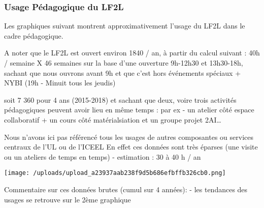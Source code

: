 \hypertarget{usage-puxe9dagogique-du-lf2l}{%
\subsubsection{Usage Pédagogique du
LF2L}\label{usage-puxe9dagogique-du-lf2l}}

Les graphiques suivant montrent approximativement l'usage du LF2L dans
le cadre pédagogique.

A noter que le LF2L est ouvert environ 1840 / an, à partir du calcul
suivant : 40h / semaine X 46 semaines sur la base d'une ouverture
9h-12h30 et 13h30-18h, sachant que nous ouvrons avant 9h et que c'est
hors événements spéciaux + NYBI (19h - Minuit tous les jeudis)

soit 7 360 pour 4 ans (2015-2018) et sachant que deux, voire trois
activités pédagogiques peuvent avoir lieu en même temps : par ex - un
atelier côté espace collaboratif + un cours côté matérialsiation et un
groupe projet 2AI\ldots{}

Nous n'avons ici pas référencé tous les usages de autres composantes ou
services centraux de l'UL ou de l'ICEEL En effet ces données sont très
éparses (une visite ou un ateliers de temps en temps) - estimation : 30
à 40 h / an

\texttt{[image: /uploads/upload\_a23937aab238f9d5b686efbffb326cb0.png]}

Commentaire sur ces données brutes (cumul sur 4 années): - les tendances
des usages se retrouve sur le 2ème graphique

